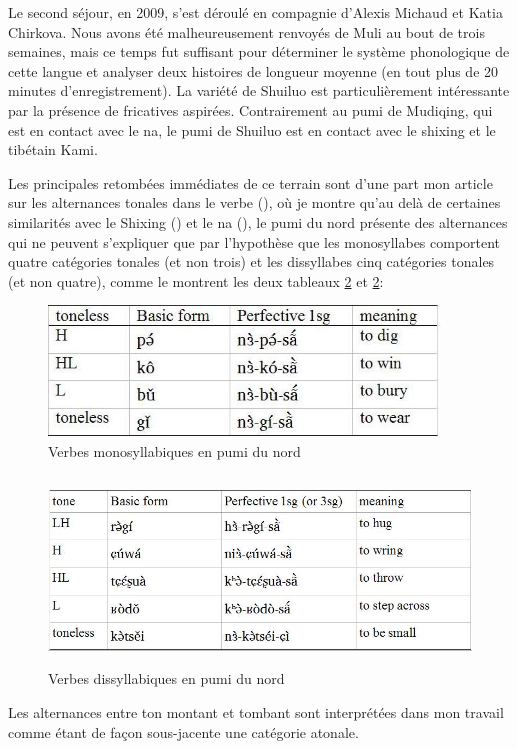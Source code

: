 \documentclass[oldfontcommands,oneside,a4paper,11pt]{memoir}
\begin{document}
Le second séjour, en 2009, s'est déroulé en compagnie d'Alexis Michaud et Katia Chirkova. Nous avons été malheureusement renvoyés de Muli au bout de trois semaines, mais ce temps fut suffisant pour déterminer le système phonologique de cette langue et analyser deux   histoires de longueur moyenne (en tout plus de 20 minutes d'enregistrement). La variété de Shuiluo est particulièrement intéressante par la présence de fricatives aspirées. Contrairement au pumi de Mudiqing, qui est en contact avec le na, le pumi de Shuiluo est en contact avec le shixing et le tibétain Kami.
 

Les principales retombées immédiates de ce terrain sont d'une part mon article sur les alternances tonales dans le verbe (\citealt{jacques11pumi.tone}), où je montre qu'au delà de certaines similarités avec le Shixing (\citealt{chirkova09tone}) et le na (\citealt{michaud08na}), le pumi du nord présente des alternances qui ne peuvent s'expliquer que par l'hypothèse que les monosyllabes comportent quatre catégories tonales (et non trois) et les dissyllabes cinq catégories tonales (et non quatre), comme le montrent les deux tableaux \ref{fig:pumi01} et \ref{fig:pumi01}:

\begin{figure}[h]
\centering
\includegraphics[height=35mm]{pumi01.jpg}
\caption{Verbes monosyllabiques en pumi du nord}
\label{fig:pumi01}
\end{figure}
\begin{figure}[h]
\centering
\includegraphics[height=50mm]{pumi02.jpg}
\caption{Verbes dissyllabiques en pumi du nord}
\label{fig:pumi01}
\end{figure}
Les alternances entre ton montant et tombant sont interprétées dans mon travail comme étant de façon sous-jacente une catégorie atonale.
\end{document}
